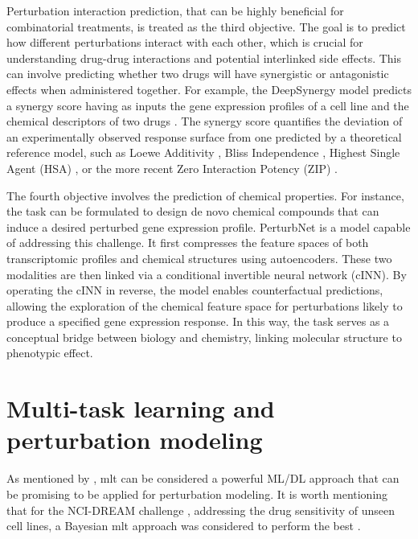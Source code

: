 \documentclass[12pt, a4paper]{article}
\begin{document}
Perturbation interaction prediction, that can be highly beneficial for combinatorial treatments, is treated as the third objective. The goal is to predict how different perturbations interact with each other, which is crucial for understanding drug-drug interactions and potential interlinked side effects. This can involve predicting whether two drugs will have synergistic or antagonistic effects when administered together. For example, the DeepSynergy model predicts a synergy score having as inputs the gene expression profiles of a cell line and the chemical descriptors of two drugs \cite{preuer2018deepsynergy}. The synergy score quantifies the deviation of an experimentally observed response surface from one predicted by a theoretical reference model, such as Loewe Additivity \cite{loewe1953problem}, Bliss Independence \cite{bliss1939toxicity}, Highest Single Agent (HSA) \cite{tan2012systematic}, or the more recent Zero Interaction Potency (ZIP) \cite{yadav2015searching}.

The fourth objective involves the prediction of chemical properties. For instance, the task can be formulated to design de novo chemical compounds that can induce a desired perturbed gene expression profile. PerturbNet \cite{yuPerturbNetPredictsSinglecell2022} is a model capable of addressing this challenge. It first compresses the feature spaces of both transcriptomic profiles and chemical structures using autoencoders. These two modalities are then linked via a conditional invertible neural network (cINN).
By operating the cINN in reverse, the model enables counterfactual predictions, allowing the exploration of the chemical feature space for perturbations likely to produce a specified gene expression response. In this way, the task serves as a conceptual bridge between biology and chemistry, linking molecular structure to phenotypic effect.

\section{Multi-task learning and perturbation modeling}

As mentioned by \cite{jiMachineLearningPerturbational2021,gavriilidisMinireviewPerturbationModelling2024}, \gls{mlt} can be considered a powerful ML/DL approach that can be promising to be applied for perturbation modeling. It is worth mentioning that for the NCI-DREAM challenge \cite{costello2014community}, addressing the drug sensitivity of unseen cell lines, a Bayesian \gls{mlt} approach was considered to perform the best \cite{schrod2024codex}. 
\end{document}
